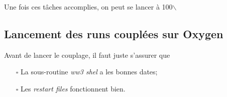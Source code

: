 \documentclass[10pt]{article}
\numberwithin{equation}{section}
\begin{document}
Une fois ces tâches accomplies, on peut se lancer à 100$\backslash$%
\subsection{Lancement des runs couplées sur Oxygen}
\label{sec:org5a626e8}
Avant de lancer le couplage, il faut juste s'assurer que
\begin{itemize}
\item[{$\square$}] La sous-routine \emph{ww3 shel} a les bonnes dates;
\item[{$\square$}] Les \emph{restart files} fonctionnent bien.
\end{itemize}
\end{document}
